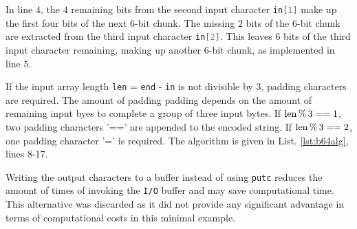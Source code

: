 \bigbreak
In line $4$, the $4$ remaining bits from the second input character \lstinline[language=C]{in[1]} make up the first four bits of the next $6$-bit chunk. The missing $2$ bits of the $6$-bit chunk are extracted from the third input character \lstinline[language=C]{in[2]}. This leaves $6$ bits of the third input character remaining, making up another $6$-bit chunk, as implemented in line $5$.

\bigbreak
If the input array length \lstinline[language=C]{len} = \lstinline[language=C]{end} - \lstinline[language=C]{in} is not divisible by $3$, padding characters are required. The amount of padding padding depends on the amount of remaining input byes to complete a group of three input bytes. If $\rm{len}\,\%\,3==1$, two padding characters '==' are appended to the encoded string. If $\rm{len}\,\%\,3==2$, one padding character '=' is required. The algorithm is given in List. \ref{lst:b64alg}, lines 8-17.

\bigbreak
Writing the output characters to a buffer instead of using \lstinline[language=C]{putc} reduces the amount of times of invoking the \texttt{I/O} buffer and may save computational time. This alternative was discarded as it did not provide any significant advantage in terms of computational costs in this minimal example.